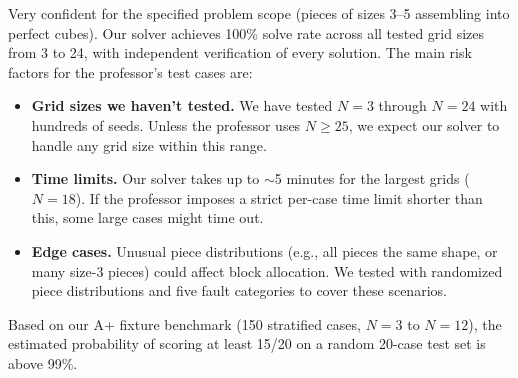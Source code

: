 \documentclass[11pt]{article}
\begin{document}
Very confident for the specified problem scope (pieces of sizes 3--5 assembling into perfect cubes). Our solver achieves 100\% solve rate across all tested grid sizes from 3 to 24, with independent verification of every solution. The main risk factors for the professor's test cases are:

\begin{itemize}[nosep]
  \item \textbf{Grid sizes we haven't tested.} We have tested $N=3$ through $N=24$ with hundreds of seeds. Unless the professor uses $N \geq 25$, we expect our solver to handle any grid size within this range.
  \item \textbf{Time limits.} Our solver takes up to $\sim$5 minutes for the largest grids ($N=18$). If the professor imposes a strict per-case time limit shorter than this, some large cases might time out.
  \item \textbf{Edge cases.} Unusual piece distributions (e.g., all pieces the same shape, or many size-3 pieces) could affect block allocation. We tested with randomized piece distributions and five fault categories to cover these scenarios.
\end{itemize}

Based on our A+ fixture benchmark (150 stratified cases, $N=3$ to $N=12$), the estimated probability of scoring at least 15/20 on a random 20-case test set is above 99\%.
\end{document}
